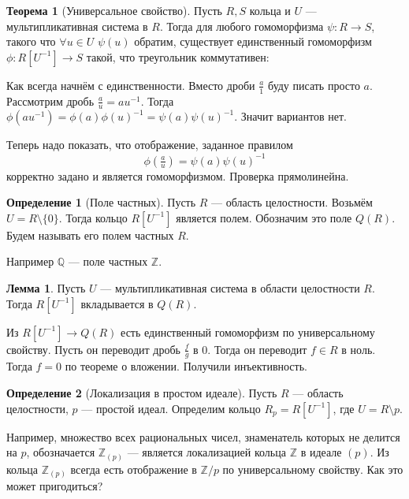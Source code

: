 \documentclass[10pt,a4paper,oneside]{book} %
\theoremstyle{definition}
\newtheorem*{defn}{Определение}
\newtheorem{thm}{Теорема}
\newtheorem{lem}{Лемма}
\newcommand{\mb}[1]{\mathbb{#1}}
\def\thrm{\begin{thm}}
\def\ethrm{\end{thm}}
\def\dfn{\begin{defn}}
\def\edfn{\end{defn}}
\def\lm{\begin{lem}}
\def\elm{\end{lem}}
\begin{document}

\thrm[Универсальное свойство] Пусть $R,S$ кольца и $U$ --- мультипликативная система в $R$. Тогда для любого гомоморфизма $\psi \colon R\to S$, такого что $\forall u\in U \,\,\psi(u)$ обратим, существует единственный гомоморфизм $\phi\colon R[U^{-1} ] \to S$ такой, что треугольник коммутативен:
\begin{center}
\end{center}
\ethrm
\proof
Как всегда начнём с единственности. Вместо дроби $\tfrac{a}{1}$ буду писать просто $a$. Рассмотрим дробь $\tfrac{a}{u}=au^{-1}$. Тогда $\phi(au^{-1})=\phi(a)\phi(u)^{-1}=\psi(a)\psi(u)^{-1}$. Значит вариантов нет.

Теперь надо показать, что отображение, заданное правилом
$$\phi(\tfrac{a}{u})=\psi(a)\psi(u)^{-1}$$
корректно задано и является гомоморфизмом. Проверка прямолинейна.
\endproof

\dfn[Поле частных] Пусть $R$ --- область целостности. Возьмём $U=R\setminus \{0\}$. Тогда кольцо $R[U^{-1}]$ является полем. Обозначим это поле $Q(R)$. Будем называть его полем частных $R$.
\edfn

Например $\mb Q$ --- поле частных $\mb Z$.

\lm Пусть $U$ --- мультипликативная система в области целостности $R$. Тогда $R[U^{-1}]$ вкладывается в $Q(R)$.
\elm
\proof
Из $R[U^{-1}]\to Q(R)$ есть единственный гомоморфизм по универсальному свойству. Пусть он переводит дробь $\frac{f}{g}$ в $0$. Тогда он переводит $f\in R$ в ноль. Тогда  $f=0$ по теореме о вложении. Получили инъективность.
\endproof

\dfn[Локализация в простом идеале] Пусть $R$  --- область целостности, $p$ --- простой идеал. Определим кольцо $R_p= R[U^{-1}]$, где $U=R\setminus p$.
\edfn

Например, множество всех рациональных чисел, знаменатель которых не делится на $p$, обозначается $\mb Z_{(p)}$ --- является локализацией кольца $\mb Z$ в идеале $(p)$. Из кольца $\mb Z_{(p)}$ всегда есть отображение в $\mb Z/p$ по универсальному свойству. Как это может пригодиться?
\end{document}
